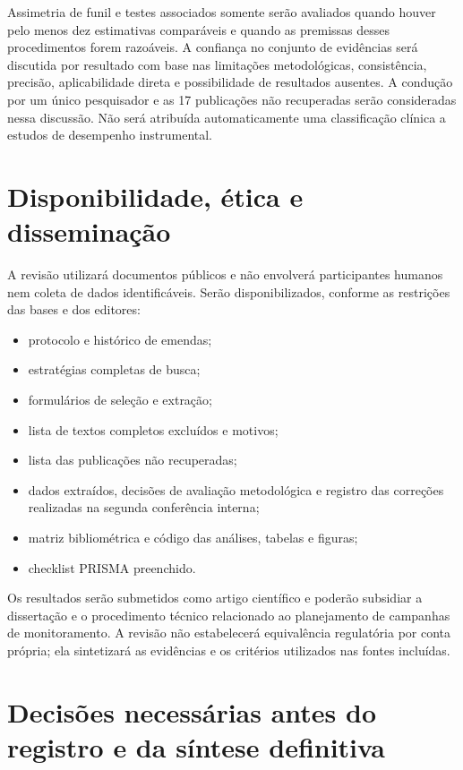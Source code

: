 \documentclass[11pt,a4paper]{article}
\begin{document}
Assimetria de funil e testes associados somente serão avaliados quando houver pelo
menos dez estimativas comparáveis e quando as premissas desses procedimentos forem
razoáveis. A confiança no conjunto de evidências será discutida por resultado com base
nas limitações metodológicas, consistência, precisão, aplicabilidade direta e
possibilidade de resultados ausentes. A condução por um único pesquisador e as 17
publicações não recuperadas serão consideradas nessa discussão. Não será atribuída
automaticamente uma classificação clínica a estudos de desempenho instrumental.

\section{Disponibilidade, ética e disseminação}

A revisão utilizará documentos públicos e não envolverá participantes humanos nem
coleta de dados identificáveis. Serão disponibilizados, conforme as restrições das
bases e dos editores:

\begin{itemize}
  \item protocolo e histórico de emendas;
  \item estratégias completas de busca;
  \item formulários de seleção e extração;
  \item lista de textos completos excluídos e motivos;
  \item lista das publicações não recuperadas;
  \item dados extraídos, decisões de avaliação metodológica e registro das correções
  realizadas na segunda conferência interna;
  \item matriz bibliométrica e código das análises, tabelas e figuras;
  \item checklist PRISMA preenchido.
\end{itemize}

Os resultados serão submetidos como artigo científico e poderão subsidiar a
dissertação e o procedimento técnico relacionado ao planejamento de campanhas de
monitoramento. A revisão não estabelecerá equivalência regulatória por conta própria;
ela sintetizará as evidências e os critérios utilizados nas fontes incluídas.

\section{Decisões necessárias antes do registro e da síntese definitiva}
\end{document}
